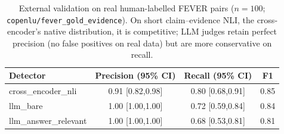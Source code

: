 \begin{table}[t]
\centering
\small
\begin{tabular}{lccc}
\toprule
Detector & Precision (95\% CI) & Recall (95\% CI) & F1 \\
\midrule
cross\_encoder\_nli & 0.91 [0.82,0.98] & 0.80 [0.68,0.91] & 0.85 \\
llm\_bare & 1.00 [1.00,1.00] & 0.72 [0.59,0.84] & 0.84 \\
llm\_answer\_relevant & 1.00 [1.00,1.00] & 0.68 [0.53,0.81] & 0.81 \\
\bottomrule
\end{tabular}
\caption{External validation on real human-labelled FEVER pairs
($n=100$; \texttt{copenlu/fever\_gold\_evidence}). On short claim--evidence NLI, the
cross-encoder's native distribution, it is competitive; LLM judges retain perfect precision
(no false positives on real data) but are more conservative on recall.}
\label{tab:fever}
\end{table}
